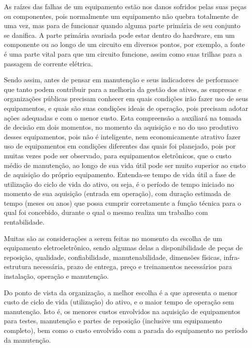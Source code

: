 As raízes das falhas de um equipamento estão nos danos sofridos pelas suas peças ou componentes, pois normalmente um equipamento não quebra totalmente de uma vez, mas para de funcionar quando alguma parte primária de seu conjunto se danifica. A parte primária avariada pode estar dentro do hardware, em um componente ou ao longo de um circuito em diversos pontos, por exemplo, a fonte é uma parte vital para que um circuito funcione, assim como suas trilhas para a passagem de corrente elétrica.

Sendo assim, antes de pensar em manutenção e seus indicadores de performace que tanto podem contribuir para a melhoria da gestão dos ativos, as empresas e organizações públicas precisam conhecer em quais condições irão fazer uso de seus equipamentos, e quais são suas condições ideais de operação, pois precisam adotar ações adequadas e com o menor custo. Esta compreensão a auxiliará na tomada de decisão em dois momentos, no momento da aquisição e no do uso produtivo desses equipamentos, pois não é inteligente, nem economicamente atrativo fazer uso de equipamentos em condições diferentes das quais foi planejado, pois por muitas vezes pode ser observado, para equipamentos eletrônicos, que o custo médio de manutenção, ao longo de sua vida útil pode ser muito superior ao custo de aquisição do próprio equipamento. Entenda-se tempo de vida útil a fase de utilização do ciclo de vida do ativo, ou seja, é o período de tempo iniciado no momento de sua aquisição (entrada em operação), com duração estimada de tempo (meses ou anos) que possa cumprir corretamente a função técnica para o qual foi concebido, durante o qual o mesmo realiza um trabalho com rentabilidade. 

Muitas são as considerações a serem feitas no momento da escolha de um equipamento eletroeletrônico, sendo algumas delas a disponibilidade de peças de reposição, qualidade, confiabilidade, manutenabilidade, dimensões físicas, infra-estrutura necessária, prazo de entrega, preço e treinamentos necessários para instalação, operação e manutenção. 

Do ponto de vista da organização, a melhor escolha é a que apresenta o menor custo de ciclo de vida (utilização) do ativo, e o maior tempo de operação sem manutenção. Isto é, os menores custos envolvidos na aquisição de equipamentos para testes, manutenção e partes de reposição (inclusive um equipamento completo), bem como o custo envolvido com a parada do equipamento no período da manutenção.
